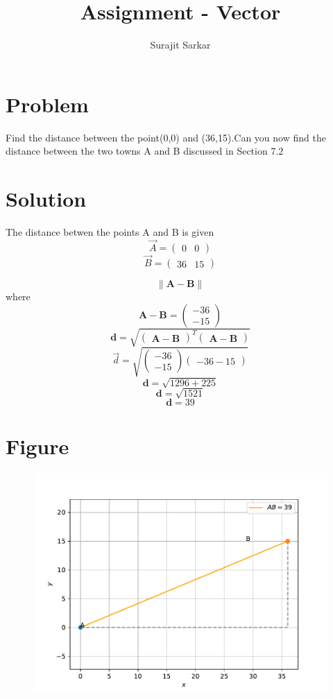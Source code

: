 \documentclass[12pt]{article}
\title{\mytitle}
\title{
Assignment - Vector
}
\author{Surajit Sarkar}
\newcommand{\myvec}[1]{\ensuremath{\begin{pmatrix}#1\end{pmatrix}}}
\let\vec\mathbf
\begin{document}
\maketitle
\tableofcontents
\bigskip
\section{\textbf{Problem}}
Find the distance between the point(0,0) and (36,15).Can you now find the distance between the two towns A and B discussed in Section 7.2
\section{\textbf{Solution}}
The distance betwen the points A and B is given
\begin{equation}
    \Vec A=\myvec{0 & 0}
\end{equation}
\begin{equation}
    \Vec B=\myvec{36 & 15}
\end{equation}

\begin{equation}
   \|\vec {A-B}\|
\end{equation}
where
\begin{equation}
    \vec {A-B}=\myvec{-36\\-15}
\end{equation}
\begin{equation}
    \vec d=\sqrt{\myvec{\vec {A-B}}^T\myvec{\vec {A-B}}}
\end{equation}
\begin{equation}
    \Vec d =\sqrt{\myvec{-36\\-15}{\myvec{-36-15}}}
\end{equation}
\begin{equation}
    \vec d=\sqrt{1296+225}
\end{equation}
\begin{equation}
    \vec d=\sqrt{1521}
\end{equation}
\begin{equation}
    \vec d=39
\end{equation}
\section{\textbf{Figure}}
\begin{figure}[h]
    \centering
\includegraphics[width=0.7\columnwidth]{vec.pdf}
    \label{fig:my_label}
\end{figure}
\end{document}
